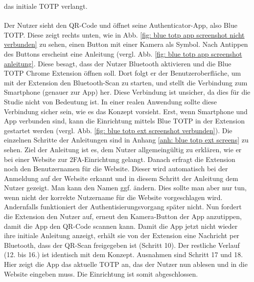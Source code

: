 das initiale TOTP verlangt.
\\\\
Der Nutzer sieht den QR-Code und öffnet seine Authenticator-App, also Blue 
TOTP. Diese zeigt rechts unten, wie in Abb. \ref{fig: blue totp app 
screenshot nicht verbunden} zu sehen, einen Button mit einer Kamera als 
Symbol. Nach Antippen des Buttons erscheint eine Anleitung (vergl. 
Abb. \ref{fig: blue totp app screenshot anleitung}. Diese besagt, dass der 
Nutzer Bluetooth aktivieren und die Blue TOTP Chrome Extension öffnen soll. 
Dort folgt er der Benutzeroberfläche, um mit der Extension den Bluetooth-Scan 
zu starten, und stellt die Verbindung zum Smartphone (genauer zur App) her. 
Diese Verbindung ist unsicher, da dies für die Studie nicht von Bedeutung 
ist. In einer realen Anwendung sollte diese Verbindung sicher sein, wie es 
das Konzept vorsieht. Erst, wenn Smartphone und App verbunden sind, kann die 
Einrichtung mittels Blue TOTP in der Extension gestartet werden (vergl. 
Abb. \ref{fig: blue totp ext screenshot verbunden}). Die einzelnen Schritte 
der Anleitungen sind in Anhang \ref{anh: blue totp ext screens} zu sehen. Ziel 
der Anleitung ist es, dem Nutzer allgemeingültig zu erklären, wie er bei 
einer Website zur 2FA-Einrichtung gelangt. Danach erfragt die Extension noch 
den Benutzernamen für die Website. Dieser wird automatisch bei der Anmeldung 
auf der Website erkannt und in diesem Schritt der Anleitung dem Nutzer 
gezeigt. Man kann den Namen ggf. ändern. Dies sollte man aber nur tun, wenn 
nicht der korrekte Nutzername  für die Website vorgeschlagen wird. 
Andernfalls funktioniert der Authentisierungsvorgang später nicht. Nun 
fordert die Extension den Nutzer auf, erneut den Kamera-Button der App 
anzutippen, damit die App den QR-Code scannen kann. Damit die App jetzt nicht 
wieder ihre initiale Anleitung anzeigt, erhält sie von der Extension eine 
Nachricht per Bluetooth, dass der QR-Scan freigegeben ist (Schritt 10). Der 
restliche Verlauf (12. bis 16.) ist identisch mit dem Konzept. Ausnahmen sind 
Schritt 17 und 18. Hier zeigt die App das aktuelle TOTP an, das der Nutzer 
nun ablesen und in die Website eingeben muss. Die Einrichtung ist somit 
abgeschlossen.

